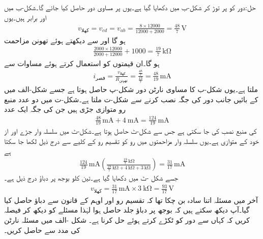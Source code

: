 حل:دور کو  پر توڑ  کر شکل-ب میں دکھایا گیا ہے۔یوں   پر مساوی دور حاصل کیا جائے گا۔شکل-ب میں  اور  برابر ہیں۔یوں
\begin{align*}
v_{\text{کھلا}} = v_{cd}= v_{ab} =\frac{8\times 12000}{12000+2000}=\frac{48}{7} \, \si{\volt}
\end{align*}
ہو گا اور   سے دیکھتے ہوئے تھونن مزاحمت
\begin{align*}
\frac{2000\times 12000}{2000+12000}+1000=\frac{19}{7}\, \si{\kilo\ohm}
\end{align*}
ہو گا۔ان قیمتوں کو استعمال کرتے ہوئے مساوات   سے
\begin{align*}
i_{\text{قصر}} =\frac{v_{\text{کھلا}}}{R_{\text{تھونن}}} =\frac{\frac{48}{7}}{\frac{19}{7}}=\frac{48}{19}\, \si{\milli\ampere}
\end{align*}
ملتا ہے۔یوں شکل-ب کا مساوی نارٹن دور شکل-پ حاصل ہوتا ہے جسے شکل-الف میں  کے بائیں جانب دور کی جگہ نصب کرنے سے شکل-ت ملتا ہے۔شکل-ت میں دو عدد منبع رو متوازی جڑی ہیں جن کی جگہ ایک عدد
\begin{align*}
\frac{48}{19} \, \si{\milli\ampere}+\SI{4}{\milli\ampere}=\frac{124}{19} \, \si{\milli\ampere}
\end{align*}
  کی منبع نصب کی جا سکتی ہے  جس سے شکل-ٹ حاصل ہوتا ہے۔شکل-ٹ میں سلسلہ وار جڑے  اور  از خود  کے متوازی ہے۔یوں سلسلہ وار مزاحمتوں میں رو کو تقسیم رو کے کلیے سے درج ذیل لکھا جا سکتا ہے
\begin{align*}
\frac{124}{19}\,\si{\milli\ampere}\left(\frac{\frac{19}{7} \, \si{\kilo\ohm}}{\frac{19}{7} \, \si{\kilo\ohm}+\SI{4}{\kilo\ohm}+\SI{3}{\kilo\ohm}} \right)=\frac{31}{17} \, \si{\milli\ampere}
\end{align*}
جسے شکل -ٹ میں دکھایا گیا ہے۔تین کلو  بوجھ پر دباؤ درج ذیل ہے۔
\begin{align*}
v_{\text{کھلا}}=\frac{31}{17} \, \si{\milli\ampere} \times \SI{3}{\kilo\ohm}=\frac{93}{17} \, \si{\volt}
\end{align*}
آخر میں مسئلہ اتنا سادہ بن چکا تھا کہ تقسیم رو اور اوہم کے قانون سے دباؤ حاصل کیا گیا۔آپ دیکھ سکتے ہیں کہ بوجھ پر دباؤ  جلد حاصل ہوا لہٰذا مسئلے کو دیکھ کر فیصلہ کریں کہ کہاں سے دور کو ٹکڑے کرتے ہوئے حل کرنا ہے۔
شکل -الف میں مسئلہ نارٹن کی مدد سے  حاصل کریں۔

